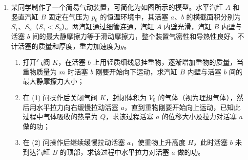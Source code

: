 \documentclass[\gkver]{gaokaozhenti}
\begin{document}
\begin{enumerate}
{\begin{enumerate}
	\item
	$\frac{{9\pi R}}{{10v}}$
\end{enumerate}
}

\item
某同学制作了一个简易气动装置，可简化为如图所示的模型。水平汽缸 $ A $ 和竖直汽缸 $ B $ 固定在气压为 $ p_{0} $ 的恒温环境中，其活塞 $ a $、$ b $ 的横截面积分别为 $ S_{1} $、$ S_{2} $（$S_{1} < S_{2}$）。两汽缸通过细管连通，汽缸 $ A $ 内壁光滑，汽缸 $ B $ 内壁与活塞 $ b $ 间的最大静摩擦力等于滑动摩擦力，整个装置气密性和导热性良好。不计活塞的质量和厚度，重力加速度为$ g $。
\begin{enumerate}
	\item 
打开气阀 $ K $，在活塞 $ b $ 上用轻质细线悬挂重物，逐渐增加重物的质量，当重物质量为 $ m $ 时活塞 $ b $ 刚要开始向下运动，求汽缸 $ B $ 内壁与活塞 $ b $ 间的最大静摩擦力大小；

\item
在 (1) 问操作后关闭气阀 $ K $，封闭体积为 $ V_{0} $ 的气体（视为理想气体），然后用水平拉力向右缓慢拉动活塞 $ a $，直到重物刚要开始向上运动，已知此过程中气体吸收的热量为 $ Q $，求该过程活塞 $ a $ 的位移大小及拉力对活塞 $ a $ 做的功；

\item
在 (2) 问操作后继续缓慢拉动活塞 $ a $，使重物上升高度 $ H $，此时活塞 $ b $ 未到达汽缸 $ B $ 的顶部，求该过程中水平拉力对活塞 $ a $ 做的功。
\end{enumerate}
\onepicture[w=10.02cm, h=7.91cm, align=right]{}
\end{enumerate}
\end{document}
